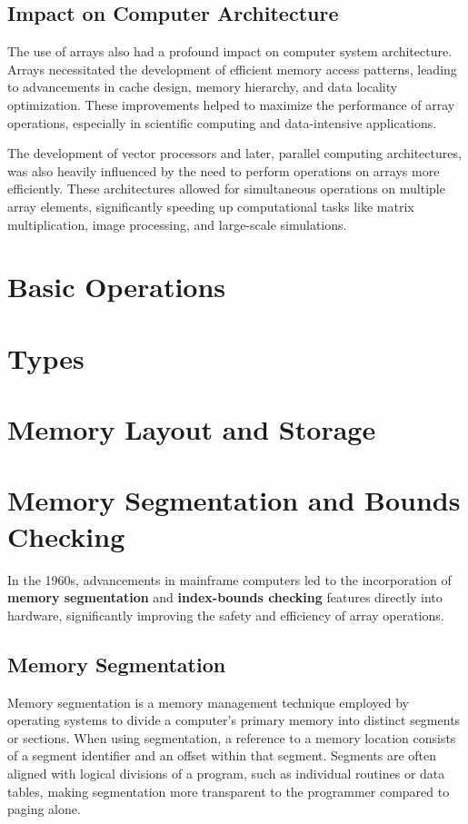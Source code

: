 \documentclass{book}
\begin{document}
	\subsection{Impact on Computer Architecture}
	
	The use of arrays also had a profound impact on computer system architecture. Arrays necessitated the development of efficient memory access patterns, leading to advancements in cache design, memory hierarchy, and data locality optimization. These improvements helped to maximize the performance of array operations, especially in scientific computing and data-intensive applications.
	
	The development of vector processors and later, parallel computing architectures, was also heavily influenced by the need to perform operations on arrays more efficiently. These architectures allowed for simultaneous operations on multiple array elements, significantly speeding up computational tasks like matrix multiplication, image processing, and large-scale simulations.
	
	
\section{Basic Operations}
\section{Types}
\section{Memory Layout and Storage}
\section{Memory Segmentation and Bounds Checking}

In the 1960s, advancements in mainframe computers led to the incorporation of \textbf{memory segmentation} and \textbf{index-bounds checking} features directly into hardware, significantly improving the safety and efficiency of array operations.

\subsection{Memory Segmentation}
Memory segmentation is a memory management technique employed by operating systems to divide a computer's primary memory into distinct segments or sections. When using segmentation, a reference to a memory location consists of a segment identifier and an offset within that segment. Segments are often aligned with logical divisions of a program, such as individual routines or data tables, making segmentation more transparent to the programmer compared to paging alone. 
\end{document}
